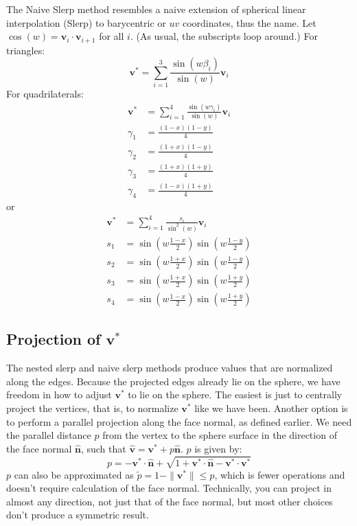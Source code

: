 \documentclass{amsart}[12pt]
\begin{document}
The Naive Slerp method resembles a naive extension of spherical linear
interpolation (Slerp) to barycentric or $uv$ coordinates, thus the
name. Let $\cos(w) = \mathbf v_i \cdot \mathbf v_{i+1}$ for all $i$. (As
usual, the subscripts loop around.) For triangles:
\begin{equation}
   \mathbf v^* = \sum_{i=1}^3\frac{\sin(w\beta_i)}{\sin(w)}  \mathbf v_i
\end{equation}
For quadrilaterals:
\begin{equation}\begin{split}
     \mathbf v^* & = \sum_{i=1}^4\frac{\sin(w\gamma_i)}{\sin(w)} \mathbf v_i \\
\gamma_1 & = \frac{(1-x)(1-y)}{4} \\
\gamma_2 & = \frac{(1+x)(1-y)}{4} \\
\gamma_3 & = \frac{(1+x)(1+y)}{4} \\
\gamma_4 & = \frac{(1-x)(1+y)}{4}
\end{split}\end{equation}
or
\begin{equation}\begin{split}
   \mathbf v^* & = \sum_{i=1}^4\frac{s_i}{\sin^2(w)}  \mathbf v_i \\
s_1 & = \sin \left(w\frac{1-x}{2}\right)\sin \left(w\frac{1-y}{2}\right) \\
s_2 & = \sin \left(w\frac{1+x}{2}\right)\sin \left(w\frac{1-y}{2}\right) \\
s_3 & = \sin \left(w\frac{1+x}{2}\right)\sin \left(w\frac{1+y}{2}\right) \\
s_4 & = \sin \left(w\frac{1-x}{2}\right)\sin \left(w\frac{1+y}{2}\right)
\end{split}\end{equation}

\subsection{Projection of $\mathbf v^*$}
The nested slerp and naive slerp methods produce values that are normalized
along the edges. Because the projected edges already lie on the sphere, we have
freedom in how to adjust $\mathbf v^*$ to lie on the sphere. The easiest is
just to centrally project the vertices, that is, to normalize $\mathbf v^*$
like we have been. Another option is to perform a parallel projection along the
face normal, as defined earlier. We need the parallel distance $p$ from the
vertex to the sphere surface in the direction of the face normal
$\hat{\mathbf n}$, such that $\hat{\mathbf v} =
\mathbf v^* + p\hat{\mathbf n}$. $p$ is given by:
\begin{equation}
   p = -\mathbf v^* \cdot \hat{\mathbf n} +
   \sqrt{1+\mathbf v^* \cdot \hat{\mathbf n}-\mathbf v^* \cdot \mathbf v^*}
\end{equation}
$p$ can also be approximated as $\widetilde{p} = 1 - \|\mathbf v^*\|
\leq p$, which is fewer operations and doesn't require
calculation of the face normal. Technically, you can project in almost any
direction, not just that of the face normal, but most other choices don't
produce a symmetric result.
\end{document}
